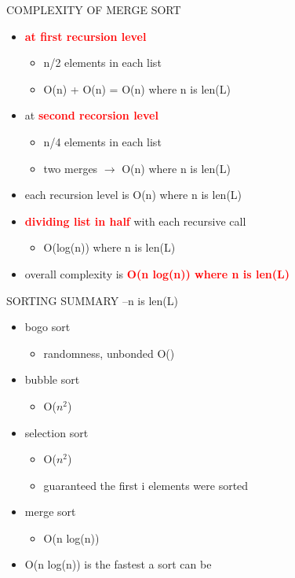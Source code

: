 \documentclass[aspectratio=169]{beamer}
\begin{document}
\begin{frame}{COMPLEXITY OF MERGE SORT}
\begin{itemize}
\item \textcolor{red}{\textbf{at first recursion level}}
\begin{itemize}
\item n/2 elements in each list
\item O(n) + O(n) = O(n) where n is len(L)
\end{itemize}
\item at \textcolor{red}{\textbf{second recorsion level}}
\begin{itemize}
\item n/4 elements in each list
\item two merges $\rightarrow$ O(n) where n is len(L)
\end{itemize}
\item each recursion level is O(n) where n is len(L)
\item \textcolor{red}{\textbf{dividing list in half}} with each recursive call
\begin{itemize}
\item O(log(n)) where n is len(L)
\end{itemize}
\item overall complexity is \textcolor{red}{\textbf{O(n log(n)) where n is len(L)}}
\end{itemize}
\end{frame}


\begin{frame}{SORTING SUMMARY --n is len(L)}
\begin{itemize}
\item bogo sort
\begin{itemize}
\item randomness, unbonded O()
\end{itemize}
\item bubble sort
\begin{itemize}
\item O($n^2$)
\end{itemize}
\item selection sort
\begin{itemize}
\item O($n^2$)
\item guaranteed the first i elements were sorted
\end{itemize}
\item merge sort
\begin{itemize}
\item O(n log(n))
\end{itemize}
\item O(n log(n)) is the fastest a sort can be
\end{itemize}
\end{frame}
\end{document}
